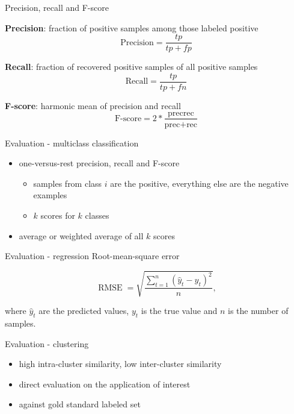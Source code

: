 \documentclass[bigger]{beamer}
\begin{document}
\begin{frame}{Precision, recall and F-score}

{\bf Precision}: fraction of positive samples among those labeled positive
\begin{equation*}
	\text{Precision}=\frac{tp}{tp+fp}
\end{equation*}

{\bf Recall}: fraction of recovered positive samples of all positive samples
\begin{equation*}
	\text{Recall}=\frac{tp}{tp+fn}
\end{equation*}

\pause

{\bf F-score}: harmonic mean of precision and recall
    \begin{equation*}
        \text{F-score} = 2 * \frac{\text{prec}  \text{rec}}{\text{prec} + \text{rec}}
    \end{equation*}
\end{frame}

\begin{frame}{Evaluation - multiclass classification}
    \begin{itemize}
        \item one-versus-rest precision, recall and F-score
            \begin{itemize}
                \item samples from class $i$ are the positive, everything else are the negative examples
                \item $k$ scores for $k$ classes
            \end{itemize}
        \item average or weighted average of all $k$ scores
    \end{itemize}
\end{frame}

\begin{frame}{Evaluation - regression}
    Root-mean-square error

    \begin{equation*}
        \operatorname{RMSE}=\sqrt{\frac{\sum_{t=1}^n (\hat y_t - y_t)^2}{n}},
    \end{equation*}

    where $\hat y_t$ are the predicted values, $y_t$ is the true value and $n$ is the number of samples.
\end{frame}

\begin{frame}{Evaluation - clustering}
    \begin{itemize}
        \item high intra-cluster similarity, low inter-cluster similarity
        \item direct evaluation on the application of interest
        \item against gold standard labeled set
    \end{itemize}
\end{frame}
\end{document}

